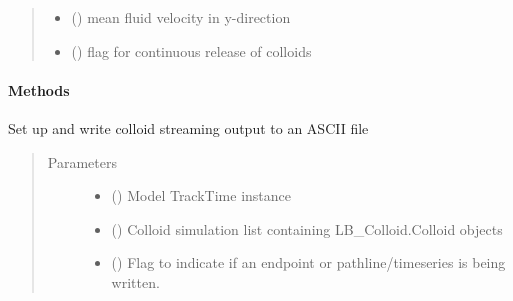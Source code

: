 \documentclass[letterpaper,10pt,english]{sphinxmanual}
\begin{document}
\begin{fulllineitems}
\begin{quote}
\begin{description}
\begin{itemize}
\item {} 
 () \textendash{} mean fluid velocity in y-direction

\item {} 
 () \textendash{} flag for continuous release of colloids

\end{itemize}

\end{description}\end{quote}
\paragraph{Methods}

\begin{fulllineitems}
\label{\detokenize{index:lb_colloids.Colloids.Colloid_IO.Output.write_output}}
Set up and write colloid streaming output to an ASCII file
\begin{quote}\begin{description}
\item[{Parameters}] \leavevmode\begin{itemize}
\item {} 
 ({\hyperref[\detokenize{index:lb_colloids.Colloids.LB_Colloid.TrackTime}]{}}) \textendash{} Model TrackTime instance

\item {} 
 () \textendash{} Colloid simulation list containing LB\_Colloid.Colloid objects

\item {} 
 () \textendash{} Flag to indicate if an endpoint or pathline/timeseries is being written.

\end{itemize}

\end{description}\end{quote}

\end{fulllineitems}


\end{fulllineitems}
\end{document}
